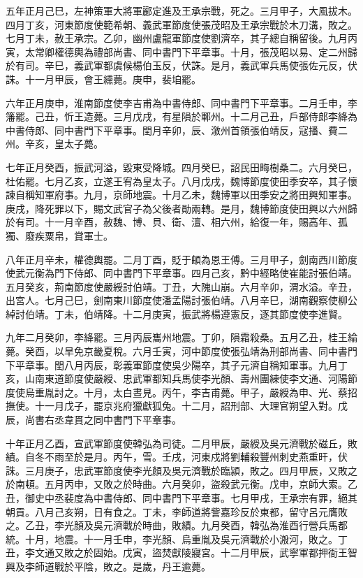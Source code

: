 \begin{pinyinscope}
 五年正月己巳，左神策軍大將軍酈定進及王承宗戰，死之。三月甲子，大風拔木。四月丁亥，河東節度使範希朝、義武軍節度使張茂昭及王承宗戰於木刀溝，敗之。七月丁未，赦王承宗。乙卯，幽州盧龍軍節度使劉濟卒，其子總自稱留後。九月丙寅，太常卿權德輿為禮部尚書、同中書門下平章事。十月，張茂昭以易、定二州歸於有司。辛巳，義武軍都虞候楊伯玉反，伏誅。是月，義武軍兵馬使張佐元反，伏誅。十一月甲辰，會王纁薨。庚申，裴垍罷。



 六年正月庚申，淮南節度使李吉甫為中書侍郎、同中書門下平章事。二月壬申，李籓罷。己丑，忻王造薨。三月戊戌，有星隕於鄆州。十二月己丑，戶部侍郎李絳為中書侍郎、同中書門下平章事。閏月辛卯，辰、漵州首領張伯靖反，寇播、費二州。辛亥，皇太子薨。



 七年正月癸酉，振武河溢，毀東受降城。四月癸巳，詔民田畮樹桑二。六月癸巳，杜佑罷。七月乙亥，立遂王宥為皇太子。八月戊戌，魏博節度使田季安卒，其子懷諫自稱知軍府事。九月，京師地震。十月乙未，魏博軍以田季安之將田興知軍事。庚戌，降死罪以下，賜文武官子為父後者勛兩轉。是月，魏博節度使田興以六州歸於有司。十一月辛酉，赦魏、博、貝、衛、澶、相六州，給復一年，賜高年、孤獨、廢疾粟帛，賞軍士。



 八年正月辛未，權德輿罷。二月丁酉，貶于頔為恩王傅。三月甲子，劍南西川節度使武元衡為門下侍郎、同中書門下平章事。四月己亥，黔中經略使崔能討張伯靖。五月癸亥，荊南節度使嚴綬討伯靖。丁丑，大隗山崩。六月辛卯，渭水溢。辛丑，出宮人。七月己巳，劍南東川節度使潘孟陽討張伯靖。八月辛巳，湖南觀察使柳公綽討伯靖。丁未，伯靖降。十二月庚寅，振武將楊遵憲反，逐其節度使李進賢。



 九年二月癸卯，李絳罷。三月丙辰巂州地震。丁卯，隕霜殺桑。五月乙丑，桂王綸薨。癸酉，以旱免京畿夏稅。六月壬寅，河中節度使張弘靖為刑部尚書、同中書門下平章事。閏八月丙辰，彰義軍節度使吳少陽卒，其子元濟自稱知軍事。九月丁亥，山南東道節度使嚴綬、忠武軍都知兵馬使李光顏、壽州團練使李文通、河陽節度使烏重胤討之。十月，太白晝見。丙午，李吉甫薨。甲子，嚴綬為申、光、蔡招撫使。十一月戊子，罷京兆府獵獻狐兔。十二月，詔刑部、大理官朔望入對。戊辰，尚書右丞韋貫之同中書門下平章事。



 十年正月乙酉，宣武軍節度使韓弘為司徒。二月甲辰，嚴綬及吳元濟戰於磁丘，敗績。自冬不雨至於是月。丙午，雪。壬戌，河東戍將劉輔殺豐州刺史燕重旰，伏誅。三月庚子，忠武軍節度使李光顏及吳元濟戰於臨潁，敗之。四月甲辰，又敗之於南頓。五月丙申，又敗之於時曲。六月癸卯，盜殺武元衡。戊申，京師大索。乙丑，御史中丞裴度為中書侍郎、同中書門下平章事。七月甲戌，王承宗有罪，絕其朝貢。八月己亥朔，日有食之。丁未，李師道將訾嘉珍反於東都，留守呂元膺敗之。乙丑，李光顏及吳元濟戰於時曲，敗績。九月癸酉，韓弘為淮酉行營兵馬都統。十月，地震。十一月壬申，李光顏、烏重胤及吳元濟戰於小溵河，敗之。丁丑，李文通又敗之於固始。戊寅，盜焚獻陵寢宮。十二月甲辰，武寧軍都押衙王智興及李師道戰於平陰，敗之。是歲，丹王逾薨。




\end{pinyinscope}
